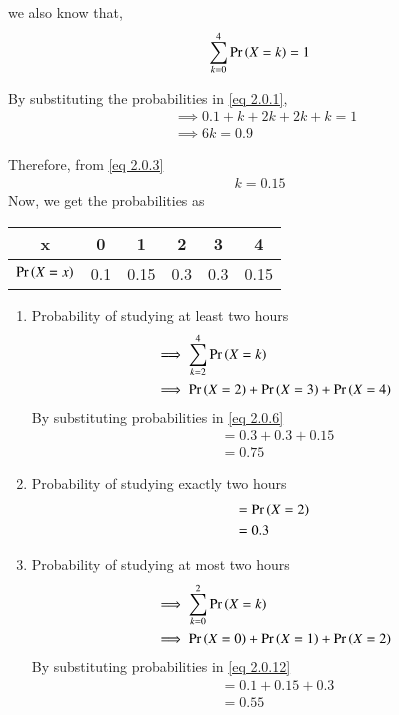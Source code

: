\documentclass[journal,12pt,twocolumn]{IEEEtran}
\begin{document}
we also know that,
\begin{align}
    \sum_{k = 0}^4 \Pr\left(X = k\right) = 1 \label{eq 2.0.1}
\end{align}

By substituting the probabilities in \eqref{eq 2.0.1},\vspace{10mm}
\begin{align}
& \implies 0.1 + k + 2k + 2k + k = 1 \\
& \implies 6k = 0.9 \label{eq 2.0.3}
\end{align}

Therefore, from \eqref{eq 2.0.3}
\begin{align}
    k = 0.15
\end{align}
  Now, we get the probabilities as
  
  \begin{center}
  
  \begin{tabular}{|c|c|c|c|c|c|}
    \hline
    x &  0 & 1 & 2 & 3 & 4\\
    \hline
    $\Pr\left(X=x\right)$ & 0.1& 0.15& 0.3 & 0.3 & 0.15\\
    \hline
    
\end{tabular} 
\end{center}
\vspace{3mm}
    \begin{enumerate}
        \item Probability of studying at least two hours 
        \begin{align}
            & \implies \sum_{k = 2}^4 \Pr\left(X = k\right)\\
            & \implies \Pr\left(X = 2\right) +\Pr\left(X = 3\right) + \Pr\left(X = 4\right) \label{eq 2.0.6}
        \end{align}
        By substituting probabilities in \eqref{eq 2.0.6}
        \begin{align}
            & = 0.3 + 0.3 + 0.15\\
            & = 0.75
        \end{align}
        
        \item Probability of studying exactly two hours
        \begin{align}
            & = \Pr\left(X = 2\right)\\
            & = 0.3
        \end{align}
        
        \item Probability of studying at most two hours 
        \begin{align}
          & \implies \sum_{k = 0}^2  \Pr\left(X = k\right)\\
          & \implies \Pr\left(X = 0\right) + \Pr\left(X = 1\right) + \Pr\left(X = 2\right) \label{eq 2.0.12}
        \end{align}
        By substituting probabilities in \eqref{eq 2.0.12}
        \begin{align}
            & = 0.1 + 0.15 + 0.3\\
            & = 0.55
        \end{align}
    \end{enumerate}
    
\end{document}
